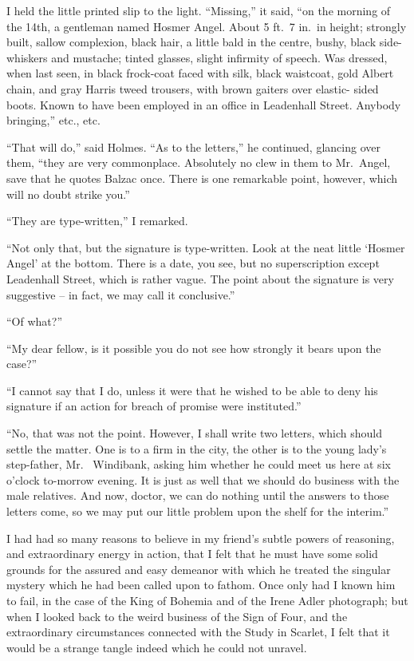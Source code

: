 I held the little printed slip to the light. “Missing,” it
said, “on the morning of the 14th, a gentleman named Hosmer
Angel. About 5 ft.\ 7 in.\ in height; strongly built, sallow
complexion, black hair, a little bald in the centre, bushy,
black side-whiskers and mustache; tinted glasses, slight infirmity
of speech. Was dressed, when last seen, in black
frock-coat faced with silk, black waistcoat, gold Albert chain,
and gray Harris tweed trousers, with brown gaiters over elastic-%
sided boots. Known to have been employed in an office in
Leadenhall Street. Anybody bringing,” etc., etc.

“That will do,” said Holmes. “As to the letters,” he continued,
glancing over them, “they are very commonplace.
Absolutely no clew in them to Mr.~Angel, save that he quotes
Balzac once. There is one remarkable point, however, which
will no doubt strike you.”

“They are type-written,” I remarked.

“Not only that, but the signature is type-written. Look at
the neat little ‘Hosmer Angel’ at the bottom. There is a
date, you see, but no superscription except Leadenhall Street,
which is rather vague. The point about the signature is very
suggestive -- in fact, we may call it conclusive.”

“Of what?”

“My dear fellow, is it possible you do not see how strongly
it bears upon the case?”

“I cannot say that I do, unless it were that he wished to
be able to deny his signature if an action for breach of
promise were instituted.”

“No, that was not the point. However, I shall write two
letters, which should settle the matter. One is to a firm in
the city, the other is to the young lady’s step-father, Mr.\ %
Windibank, asking him whether he could meet us here at six
o’clock to-morrow evening. It is just as well that we should
do business with the male relatives. And now, doctor, we
can do nothing until the answers to those letters come, so we
may put our little problem upon the shelf for the interim.”

I had had so many reasons to believe in my friend’s subtle
powers of reasoning, and extraordinary energy in action, that
I felt that he must have some solid grounds for the assured
and easy demeanor with which he treated the singular mystery
which he had been called upon to fathom. Once only had
I known him to fail, in the case of the King of Bohemia and
of the Irene Adler photograph; but when I looked back to the
weird business of the Sign of Four, and the extraordinary
circumstances connected with the Study in Scarlet, I felt that it
would be a strange tangle indeed which he could not unravel.

